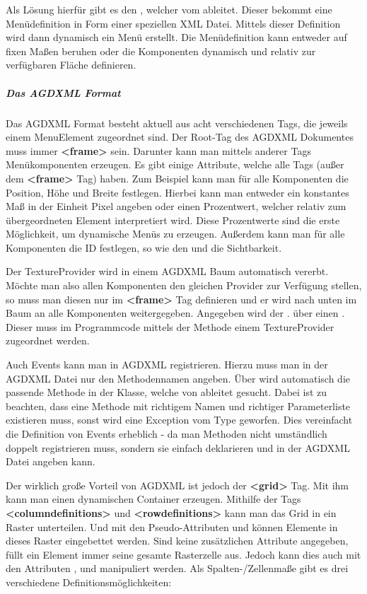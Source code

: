 Als Lösung hierfür gibt es den , welcher vom  ableitet. Dieser bekommt eine Menüdefinition in Form einer speziellen XML Datei. Mittels dieser Definition wird dann dynamisch ein Menü erstellt. Die Menüdefinition kann entweder auf fixen Maßen beruhen oder die Komponenten dynamisch und relativ zur verfügbaren Fläche definieren.

\subparagraph{Das AGDXML Format}


Das AGDXML Format besteht aktuell aus acht verschiedenen Tags, die jeweils einem MenuElement zugeordnet sind. Der Root-Tag des AGDXML Dokumentes muss immer \textbf{<frame>} sein. Darunter kann man mittels anderer Tags Menükomponenten erzeugen. Es gibt einige Attribute, welche alle Tags (außer dem \textbf{<frame>} Tag) haben. Zum Beispiel kann man für alle Komponenten die Position, Höhe und Breite festlegen. Hierbei kann man entweder ein konstantes Maß in der Einheit Pixel angeben oder einen Prozentwert, welcher relativ zum übergeordneten Element interpretiert wird. Diese Prozentwerte sind die erste Möglichkeit, um dynamische Menüs zu erzeugen. Außerdem kann man für alle Komponenten die ID festlegen, so wie den  und die Sichtbarkeit.

Der TextureProvider wird in einem AGDXML Baum automatisch vererbt. Möchte man also allen Komponenten den gleichen Provider zur Verfügung stellen, so muss man diesen nur im \textbf{<frame>} Tag definieren und er wird nach unten im Baum an alle Komponenten weitergegeben. 
Angegeben wird der . über einen . Dieser muss im Programmcode mittels der Methode  einem TextureProvider zugeordnet werden.

Auch Events kann man in AGDXML registrieren. Hierzu muss man in der AGDXML Datei nur den Methodennamen angeben. Über  wird automatisch die passende Methode in der Klasse, welche von  ableitet gesucht. Dabei ist zu beachten, dass eine Methode mit richtigem Namen und richtiger Parameterliste existieren muss, sonst wird eine Exception vom Type  geworfen. Dies vereinfacht die Definition von Events erheblich - da man Methoden nicht umständlich doppelt registrieren muss, sondern sie einfach deklarieren und in der AGDXML Datei angeben kann.

Der wirklich große Vorteil von AGDXML ist jedoch der \textbf{<grid>} Tag. Mit ihm kann man einen dynamischen Container erzeugen. Mithilfe der Tags \textbf{<columndefinitions>} und \textbf{<rowdefinitions>} kann man das Grid in ein Raster unterteilen. Und mit den Pseudo-Attributen  und  können Elemente in dieses Raster eingebettet werden. Sind keine zusätzlichen Attribute angegeben, füllt ein Element immer seine gesamte Rasterzelle aus. Jedoch kann dies auch mit den Attributen ,  und  manipuliert werden. Als Spalten-/Zellenmaße gibt es drei verschiedene Definitionsmöglichkeiten:

